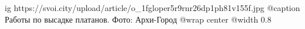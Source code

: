  
 
 
 
 

\ifcmt
  ig https://svoi.city/upload/article/o_1fgloper5r9rnr26dp1ph81v155f.jpg
  @caption Работы по высадке платанов. Фото: Архи-Город
  @wrap center
  @width 0.8
\fi
